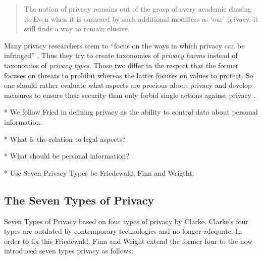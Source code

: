 \begin{quote}
The notion of privacy remains out of the grasp of every academic chasing it. Even when it is cornered by such additional modifiers as `our' privacy, it still finds a way to remain elusive.
\end{quote}

Many privacy researchers seem to ``focus on the ways in which privacy can be infringed'' \cite{1}.
Thus they try to create taxonomies of \emph{privacy harms} instead of taxonomies of \emph{privacy types}.
Those two differ in the respect that the former focuses on threats to prohibit whereas the latter focuses on values to protect.
So one should rather evaluate what aspects are precious about privacy and develop measures to ensure their security than only forbid single actions against privacy \cite{1}.


* We follow Fried in defining privacy as the ability to control data about personal information.

* What is the relation to legal aspects?

* What should be personal information?

* Use Seven Privacy Types be Friedewald, Finn and Wrigtht.

\subsection{The Seven Types of Privacy}

Seven Types of Privacy based on four types of privacy by Clarke.
Clarke's four types are outdated by contemporary technologies and no longer adequate.
In order to fix this Friedewald, Finn and Wright extend the former four to the now introduced seven types privacy as follows:

